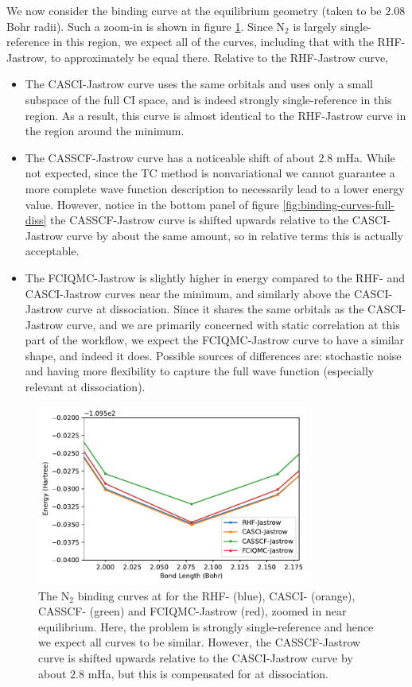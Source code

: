 We now consider the binding curve at the equilibrium geometry (taken to be $2.08$ Bohr radii). Such a zoom-in is shown in figure \ref{fig:binding-curves-minimum}. Since N$_2$ is largely single-reference in this region, we expect all of the curves, including that with the RHF-Jastrow, to approximately be equal there. Relative to the RHF-Jastrow curve,
\begin{itemize}
    \item The CASCI-Jastrow curve uses the same orbitals and uses only a small subspace of the full CI space, and is indeed strongly single-reference in this region. As a result, this curve is almost identical to the RHF-Jastrow curve in the region around the minimum.
    \item The CASSCF-Jastrow curve has a noticeable shift of about $2.8$ mHa. While not expected, since the TC method is nonvariational we cannot guarantee a more complete wave function description to necessarily lead to a lower energy value. However, notice in the bottom panel of figure \ref{fig:binding-curves-full-diss} the CASSCF-Jastrow curve is shifted upwards relative to the CASCI-Jastrow curve by about the same amount, so in relative terms this is actually acceptable.
    \item The FCIQMC-Jastrow is slightly higher in energy compared to the RHF- and CASCI-Jastrow curves near the minimum, and similarly above the CASCI-Jastrow curve at dissociation. Since it shares the same orbitals as the CASCI-Jastrow curve, and we are primarily concerned with static correlation at this part of the workflow, we expect the FCIQMC-Jastrow curve to have a similar shape, and indeed it does. Possible sources of differences are: stochastic noise and having more flexibility to capture the full wave function (especially relevant at dissociation).
\end{itemize}

\begin{figure}[htbp]
    \centering
    \includegraphics[width=0.8\textwidth]{figures/binding/all_binding_curves_min}
    \caption{The N$_2$ binding curves at \avtz for the RHF- (blue), CASCI- (orange), CASSCF- (green) and FCIQMC-Jastrow (red), zoomed in near equilibrium. Here, the problem is strongly single-reference and hence we expect all curves to be similar. However, the CASSCF-Jastrow curve is shifted upwards relative to the CASCI-Jastrow curve by about $2.8$ mHa, but this is compensated for at dissociation.}
    \label{fig:binding-curves-minimum}
\end{figure}


